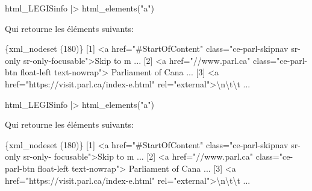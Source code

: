 \documentclass[
  letterpaper,
  DIV=11,
  numbers=noendperiod]{scrreprt}
\newenvironment{Shaded}{\begin{snugshade}}{\end{snugshade}}
\newcommand{\DataTypeTok}[1]{\textcolor[rgb]{0.68,0.00,0.00}{#1}}
\newcommand{\ErrorTok}[1]{\textcolor[rgb]{0.68,0.00,0.00}{#1}}
\newcommand{\ExtensionTok}[1]{\textcolor[rgb]{0.00,0.23,0.31}{#1}}
\newcommand{\KeywordTok}[1]{\textcolor[rgb]{0.00,0.23,0.31}{#1}}
\newcommand{\NormalTok}[1]{\textcolor[rgb]{0.00,0.23,0.31}{#1}}
\newcommand{\OperatorTok}[1]{\textcolor[rgb]{0.37,0.37,0.37}{#1}}
\newcommand{\StringTok}[1]{\textcolor[rgb]{0.13,0.47,0.30}{#1}}
\begin{document}
\begin{Shaded}
\begin{Highlighting}[]
\ExtensionTok{html\_LEGISinfo} \KeywordTok{|}\OperatorTok{\textgreater{}}\NormalTok{ html\_elements}\KeywordTok{(}\StringTok{"a"}\KeywordTok{)}
\end{Highlighting}
\end{Shaded}

Qui retourne les éléments suivants:

\begin{Shaded}
\begin{Highlighting}[]
\ExtensionTok{\{xml\_nodeset} \ErrorTok{(}\ExtensionTok{180}\KeywordTok{)}\ErrorTok{\}}
 \ExtensionTok{[1]} \OperatorTok{\textless{}}\NormalTok{a href=}\StringTok{"\#StartOfContent"}\NormalTok{ class=}\StringTok{"ce{-}parl{-}skipnav sr{-}only }
\StringTok{ sr{-}only{-}focusable"}\OperatorTok{\textgreater{}}\NormalTok{Skip to m ...}
 \ExtensionTok{[2]} \OperatorTok{\textless{}}\NormalTok{a href=}\StringTok{"//www.parl.ca"}\NormalTok{ class=}\StringTok{"ce{-}parl{-}btn float{-}left text{-}nowrap"}\OperatorTok{\textgreater{}}
 \ExtensionTok{Parliament}\NormalTok{ of Cana ...}
 \ExtensionTok{[3]} \OperatorTok{\textless{}}\NormalTok{a href=}\StringTok{"https://visit.parl.ca/index{-}e.html"}\NormalTok{ rel=}\StringTok{"external"}\OperatorTok{\textgreater{}}\DataTypeTok{\textbackslash{}n\textbackslash{}t\textbackslash{}t}\NormalTok{                    ...}
\end{Highlighting}
\end{Shaded}

\begin{Shaded}
\begin{Highlighting}[]
\ExtensionTok{html\_LEGISinfo} \KeywordTok{|}\OperatorTok{\textgreater{}}\NormalTok{ html\_elements}\KeywordTok{(}\StringTok{"a"}\KeywordTok{)}
\end{Highlighting}
\end{Shaded}

Qui retourne les éléments suivants:

\begin{Shaded}
\begin{Highlighting}[]
\ExtensionTok{\{xml\_nodeset} \ErrorTok{(}\ExtensionTok{180}\KeywordTok{)}\ErrorTok{\}}
 \ExtensionTok{[1]} \OperatorTok{\textless{}}\NormalTok{a href=}\StringTok{"\#StartOfContent"}\NormalTok{ class=}\StringTok{"ce{-}parl{-}skipnav sr{-}only sr{-}only{-}}
\StringTok{ focusable"}\OperatorTok{\textgreater{}}\NormalTok{Skip to m ...}
 \ExtensionTok{[2]} \OperatorTok{\textless{}}\NormalTok{a href=}\StringTok{"//www.parl.ca"}\NormalTok{ class=}\StringTok{"ce{-}parl{-}btn float{-}left text{-}nowrap"}\OperatorTok{\textgreater{}}
 \ExtensionTok{Parliament}\NormalTok{ of Cana ...}
 \ExtensionTok{[3]} \OperatorTok{\textless{}}\NormalTok{a href=}\StringTok{"https://visit.parl.ca/index{-}e.html"}\NormalTok{ rel=}\StringTok{"external"}\OperatorTok{\textgreater{}}\DataTypeTok{\textbackslash{}n\textbackslash{}t\textbackslash{}t}\NormalTok{                    ...}
\end{Highlighting}
\end{Shaded}
\end{document}
